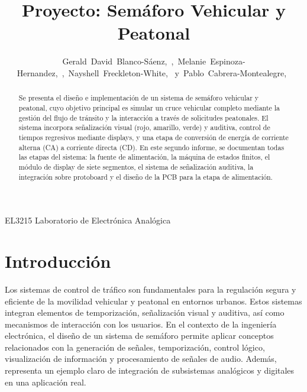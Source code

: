 \documentclass[12pt, journal, onecolumn]{IEEEtran}
\begin{document}
\title{Proyecto: Semáforo Vehicular y Peatonal}
	
	
\author{Gerald~David~Blanco-Sáenz,~,~Melanie~Espinoza-Hernandez,~,~Nayshell~Freckleton-White,~ 
	y~Pablo~Cabrera-Montealegre,~}
	
	
%
{EL3215 Laboratorio de Electrónica Analógica}
	
	
\maketitle
	
\begin{abstract}
		Se presenta el diseño e implementación de un sistema de semáforo vehicular y peatonal, cuyo objetivo principal es simular un cruce vehicular completo mediante la gestión del flujo de tránsito y la interacción a través de solicitudes peatonales. El sistema incorpora señalización visual (rojo, amarillo, verde) y auditiva, control de tiempos regresivos mediante displays, y una etapa de conversión de energía de corriente alterna (CA) a corriente directa (CD). En este segundo informe, se documentan todas las etapas del sistema: la fuente de alimentación, la máquina de estados finitos, el módulo de display de siete segmentos, el sistema de señalización auditiva, la integración sobre protoboard y el diseño de la PCB para la etapa de alimentación.
\end{abstract}
	
\section{Introducción}
	Los sistemas de control de tráfico son fundamentales para la regulación segura y eficiente de la movilidad vehicular y peatonal en entornos urbanos. Estos sistemas integran elementos de temporización, señalización visual y auditiva, así como mecanismos de interacción con los usuarios. En el contexto de la ingeniería electrónica, el diseño de un sistema de semáforo permite aplicar conceptos relacionados con la generación de señales, temporización, control lógico, visualización de información y procesamiento de señales de audio. Además, representa un ejemplo claro de integración de subsistemas analógicos y digitales en una aplicación real. \\
	
\end{document}

